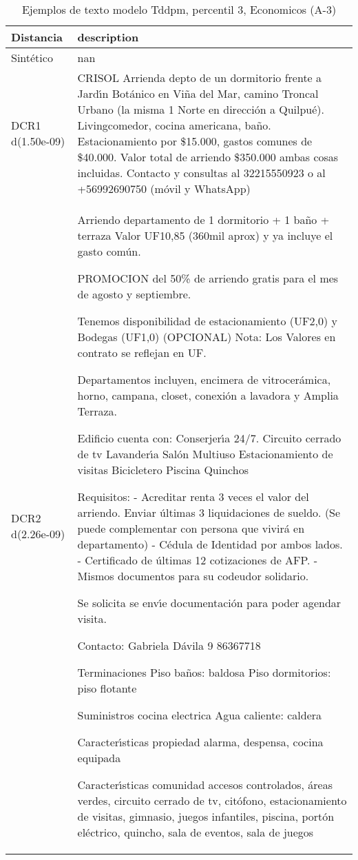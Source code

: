 \begin{table}[H]
\centering
\fontsize{10}{14}\selectfont
\caption{Ejemplos de texto modelo Tddpm, percentil 3, Economicos (A-3)}
\label{table-example-economicos-a-3-tddpm_mlp-3p-text}
\begin{tabular}{|l|m{35em}|}
\hline
\rowcolor[gray]{0.8}
Distancia & description \\
\hline Sintético & nan \\
\hline DCR1 d(1.50e-09) & CRISOL Arrienda depto de un dormitorio frente a Jard{\'\i}n Bot\'anico en Vi\~na del Mar, camino Troncal Urbano (la misma 1 Norte en direcci\'on a Quilpu\'e). Livingcomedor, cocina americana, ba\~no. Estacionamiento por \$15.000, gastos comunes de \$40.000. Valor total de arriendo \$350.000 ambas cosas incluidas. Contacto y consultas al 32215550923 o al +56992690750 (m\'ovil y WhatsApp) \\
\hline DCR2 d(2.26e-09) & Arriendo departamento de 1 dormitorio + 1 ba\~no + terraza
Valor UF10,85 (360mil aprox) y ya incluye el gasto com\'un.

PROMOCION del 50\% de arriendo gratis para el mes de agosto y septiembre.

Tenemos disponibilidad de estacionamiento (UF2,0) y Bodegas (UF1,0) (OPCIONAL)
Nota: Los Valores en contrato se reflejan en UF.

Departamentos incluyen, encimera de vitrocer\'amica, horno, campana, closet, conexi\'on a lavadora y Amplia Terraza.

Edificio cuenta con:
Conserjer{\'\i}a 24/7.
Circuito cerrado de tv
Lavander{\'\i}a
Sal\'on Multiuso
Estacionamiento de visitas
Bicicletero
Piscina
Quinchos


Requisitos:
- Acreditar renta 3 veces el valor del arriendo. Enviar \'ultimas 3 liquidaciones de sueldo. (Se puede complementar con persona que vivir\'a en departamento)
- C\'edula de Identidad por ambos lados.
- Certificado de \'ultimas 12 cotizaciones de AFP.
- Mismos documentos para su codeudor solidario.

Se solicita se env{\'\i}e documentaci\'on para poder agendar visita.

Contacto:
Gabriela D\'avila
9 86367718

Terminaciones
Piso ba\~nos: baldosa
Piso dormitorios: piso flotante

Suministros
cocina electrica
Agua caliente: caldera

Caracter{\'\i}sticas propiedad
alarma, despensa, cocina equipada

Caracter{\'\i}sticas comunidad
accesos controlados, \'areas verdes, circuito cerrado de tv, cit\'ofono, estacionamiento de visitas, gimnasio, juegos infantiles, piscina, port\'on el\'ectrico, quincho, sala de eventos, sala de juegos \\
\hline
\end{tabular}
\end{table}
